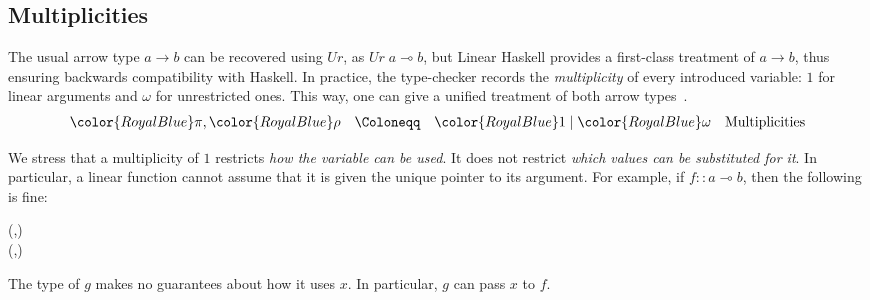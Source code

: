 \documentclass[acmsmall,usenames,dvipsnames,natbib=false,acmthm=false,screen]{acmart}
\newcommand{\Conid}[1]{\mathit{#1}}
\newcommand{\Varid}[1]{\mathit{#1}}
\def\resethooks{%
  \global\let\SaveRestoreHook\empty
  \global\let\ColumnHook\empty}
\let\hspre\empty
\let\hspost\empty
\newcommand{\multiplicitycolour}{\color{RoyalBlue}}
\newcommand{\multiplicityfont}[1]{{\multiplicitycolour#1}}
\newcommand{\bnfeq}{\mathrel{\Coloneqq}}
\newcommand{\bnfor}{\mathrel{\mid}}
\theoremstyle{acmplain}
\theoremstyle{acmdefinition}
\begin{document}
\subsection{Multiplicities}
\label{sec:multiplicities}
The usual arrow type \ensuremath{\Varid{a}\to \Varid{b}} can be recovered using \ensuremath{\Conid{Ur}}, as \ensuremath{\Conid{Ur}\;\Varid{a}\mathbin{⊸}\Varid{b}}, but Linear
Haskell provides a first-class treatment of \ensuremath{\Varid{a}\to \Varid{b}}, thus ensuring
backwards compatibility with Haskell. In practice, the type-checker
records the \emph{multiplicity} of every introduced variable: \(1\) for linear
arguments and \(ω\) for unrestricted ones. This way, one can give a unified treatment
of both arrow types~\citep{linearity-and-pi-calculus}.
$$
\begin{array}{lcll}
    \multiplicityfont{ \pi }  ,   \multiplicityfont{ \rho }   & \bnfeq &   \multiplicityfont{ \ottsym{1} }   \bnfor   \multiplicityfont{ \omega }   & \text{Multiplicities}
\end{array}
$$

We stress that a multiplicity of \(1\) restricts \emph{how the variable can be used}. It does not
restrict \emph{which values can be substituted for it}.
In particular, a linear function cannot assume that it is given the
unique pointer to its argument.  For example, if \ensuremath{\Varid{f}\mathbin{::}\Varid{a}\mathbin{⊸}\Varid{b}}, then
the following is fine:
\begin{hscode}\SaveRestoreHook
\column{B}{@{}>{\hspre}l<{\hspost}@{}}%
\column{E}{@{}>{\hspre}l<{\hspost}@{}}%
\>[B]{}\Varid{g}\mathbin{::}\Varid{a}\to (\Varid{b},\Varid{b}){}\<[E]%
\\
\>[B]{}\Varid{g}\;\Varid{x}\mathrel{=}(\Varid{f}\;\Varid{x},\Varid{f}\;\Varid{x}){}\<[E]%
\ColumnHook
\end{hscode}\resethooks
The type of \ensuremath{\Varid{g}} makes no guarantees about how it uses \ensuremath{\Varid{x}}.
In particular, \ensuremath{\Varid{g}} can pass \ensuremath{\Varid{x}} to \ensuremath{\Varid{f}}.
\end{document}

